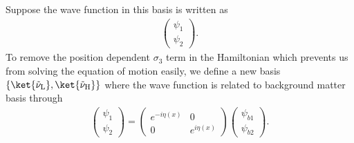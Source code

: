 \documentclass[letterpaper,12pt,english]{sphinxmanual}
\begin{document}
Suppose the wave function in this basis is written as
\begin{equation*}
\begin{split}\begin{pmatrix} \psi_1 \\ \psi_2 \end{pmatrix}.\end{split}
\end{equation*}
To remove the position dependent \(\sigma_3\) term in the Hamiltonian which prevents us from solving the equation of motion easily, we define a new basis \(\{\ket{\tilde\nu_{\mathrm{L}}},\ket{\tilde\nu_{\mathrm{H}}}\}\) where the wave function is related to background matter basis through
\begin{equation*}
\begin{split}\begin{pmatrix} \psi_1 \\ \psi_2 \end{pmatrix} = \begin{pmatrix} e^{-i \eta (x)} & 0 \\  0 & e^{i \eta (x)}  \end{pmatrix} \begin{pmatrix} \psi_{b1} \\ \psi_{b2} \end{pmatrix}.\end{split}
\end{equation*}
\end{document}
